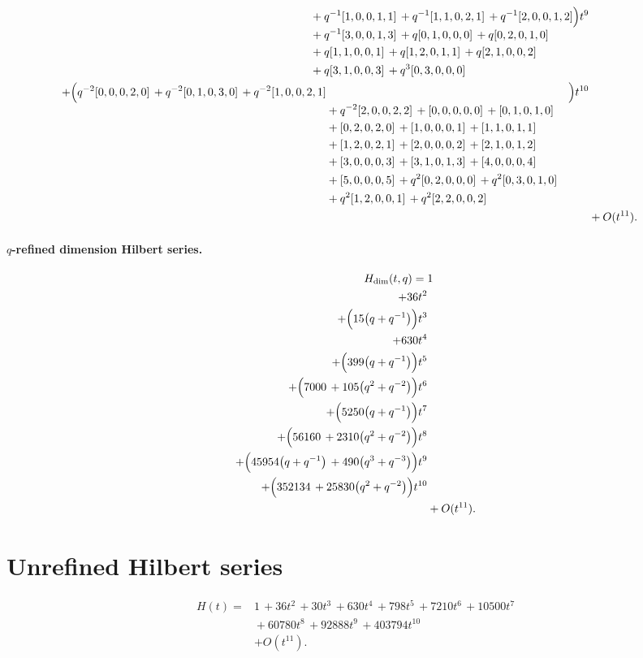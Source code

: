 \documentclass[10pt]{article}
\begin{document}
\[\begin{aligned}
\begin{aligned}[t]
  &{}+q^{-1}[1,0,0,1,1]\,+q^{-1}[1,1,0,2,1]\,+q^{-1}[2,0,0,1,2] \\
  &{}+q^{-1}[3,0,0,1,3]\,+q[0,1,0,0,0]\,+q[0,2,0,1,0] \\
  &{}+q[1,1,0,0,1]\,+q[1,2,0,1,1]\,+q[2,1,0,0,2] \\
  &{}+q[3,1,0,0,3]\,+q^{3}[0,3,0,0,0]\end{aligned}\Bigr)t^{9} \\
  + \Bigl(\begin{aligned}[t]q^{-2}[0,0,0,2,0]\,+q^{-2}[0,1,0,3,0]\,+q^{-2}[1,0,0,2,1] \\
  &{}+q^{-2}[2,0,0,2,2]\,+[0,0,0,0,0]\,+[0,1,0,1,0] \\
  &{}+[0,2,0,2,0]\,+[1,0,0,0,1]\,+[1,1,0,1,1] \\
  &{}+[1,2,0,2,1]\,+[2,0,0,0,2]\,+[2,1,0,1,2] \\
  &{}+[3,0,0,0,3]\,+[3,1,0,1,3]\,+[4,0,0,0,4] \\
  &{}+[5,0,0,0,5]\,+q^{2}[0,2,0,0,0]\,+q^{2}[0,3,0,1,0] \\
  &{}+q^{2}[1,2,0,0,1]\,+q^{2}[2,2,0,0,2]\end{aligned}\Bigr)t^{10} \\
  &+ O(t^{11}).
\end{aligned}
\]
\paragraph{$q$-refined dimension Hilbert series.}
\[
\begin{aligned}
H_{\mathrm{dim}}(t,q) ={}&
   1 \\
  + 36t^{2} \\
  + \Bigl(15\bigl(q+q^{-1}\bigr)\Bigr)t^{3} \\
  + 630t^{4} \\
  + \Bigl(399\bigl(q+q^{-1}\bigr)\Bigr)t^{5} \\
  + \Bigl(7000\,+105\bigl(q^{2}+q^{-2}\bigr)\Bigr)t^{6} \\
  + \Bigl(5250\bigl(q+q^{-1}\bigr)\Bigr)t^{7} \\
  + \Bigl(56160\,+2310\bigl(q^{2}+q^{-2}\bigr)\Bigr)t^{8} \\
  + \Bigl(45954\bigl(q+q^{-1}\bigr)\,+490\bigl(q^{3}+q^{-3}\bigr)\Bigr)t^{9} \\
  + \Bigl(352134\,+25830\bigl(q^{2}+q^{-2}\bigr)\Bigr)t^{10} \\
  &+ O(t^{11}).
\end{aligned}
\]

\section{Unrefined Hilbert series}
\[
\begin{aligned}
H(t) ={}& 1\,+36t^{2}\,+30t^{3}\,+630t^{4}\,+798t^{5}\,+7210t^{6}\,+10500t^{7} \\
  &{}+60780t^{8}\,+92888t^{9}\,+403794t^{10} \\
  &+ O(t^{11}).
\end{aligned}
\]
\end{document}
